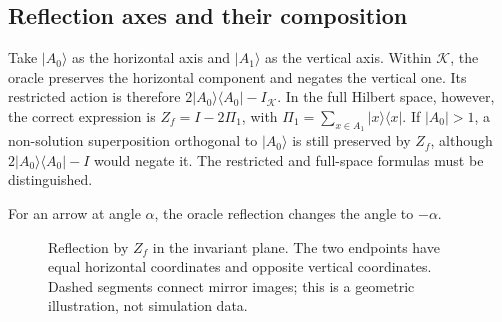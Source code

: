 \documentclass[11pt,oneside,openany]{book}
\providecommand{\ket}{}
\renewcommand{\ket}[1]{\lvert #1\rangle}
\newcommand{\ketbra}[2]{\lvert #1\rangle\langle #2\rvert}
\theoremstyle{definition}
\begin{document}
\subsection{Reflection axes and their composition}

Take $\ket{A_0}$ as the horizontal axis and $\ket{A_1}$ as the vertical axis. Within $\mathcal K$, the oracle preserves the horizontal component and negates the vertical one. Its restricted action is therefore $2\ketbra{A_0}{A_0}-I_{\mathcal K}$. In the full Hilbert space, however, the correct expression is $Z_f=I-2\Pi_1$, with $\Pi_1=\sum_{x\in A_1}\ketbra xx$. If $|A_0|>1$, a non-solution superposition orthogonal to $\ket{A_0}$ is still preserved by $Z_f$, although $2\ketbra{A_0}{A_0}-I$ would negate it. The restricted and full-space formulas must be distinguished.

For an arrow at angle $\alpha$, the oracle reflection changes the angle to $-\alpha$.
\par
\begin{figure}[htbp]
 \centering
 \caption{Reflection by $Z_f$ in the invariant plane. The two endpoints have equal horizontal coordinates and opposite vertical coordinates. Dashed segments connect mirror images; this is a geometric illustration, not simulation data.}
 \label{fig:search-reflection-z}
\end{figure}
\par
\end{document}
